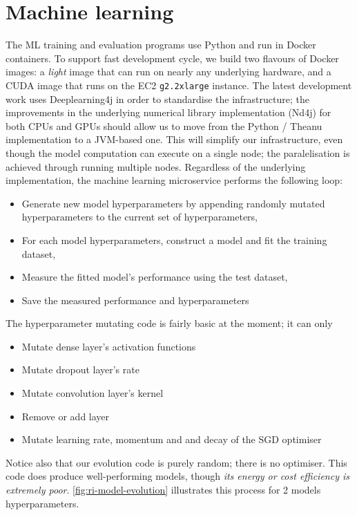 \documentclass[a4paper, 10 pt, conference]{IEEEtran}
\begin{document}
\section{Machine learning}

The ML training and evaluation programs use Python and run in Docker containers. To support fast development cycle, we build two flavours of Docker images: a \emph{light} image that can run on nearly any underlying hardware, and a CUDA \cite{cuda} image that runs on the EC2 \texttt{g2.2xlarge} instance. The latest development work uses Deeplearning4j \cite{dl4j} in order to standardise the infrastructure; the improvements in the underlying numerical library implementation (Nd4j) for both CPUs and GPUs should allow us to move from the Python / Theanu implementation to a JVM-based one. This will simplify our infrastructure, even though the model computation can execute on a single node; the paralelisation is achieved through running multiple nodes. Regardless of the underlying implementation, the machine learning microservice performs the following loop:

\begin{itemize}
\item Generate new model hyperparameters by appending randomly mutated hyperparameters to the current set of hyperparameters,
\item For each model hyperparameters, construct a model and fit the training dataset,
\item Measure the fitted model's performance using the test dataset,
\item Save the measured performance and hyperparameters
\end{itemize}

The hyperparameter mutating code is fairly basic at the moment; it can only

\begin{itemize}
\item Mutate dense layer's activation functions
\item Mutate dropout layer's rate
\item Mutate convolution layer's kernel
\item Remove or add layer
\item Mutate learning rate, momentum and and decay of the SGD optimiser
\end{itemize}

Notice also that our evolution code is purely random; there is no optimiser. This code does produce well-performing models, though \emph{its energy or cost efficiency is extremely poor}. \autoref{fig:ri-model-evolution} illustrates this process for 2 models hyperparameters.
\end{document}
